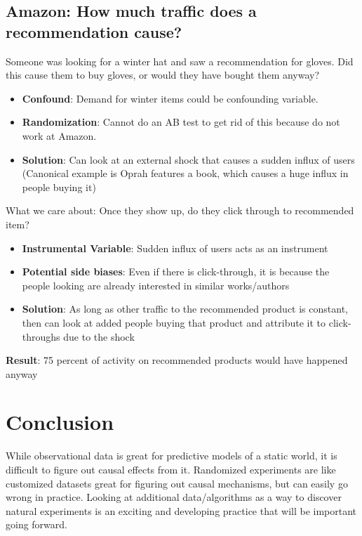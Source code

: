 \subsection{Amazon: How much traffic does a recommendation cause?}
Someone was looking for a winter hat and saw a recommendation for gloves. Did this cause them to buy gloves, or would they have bought them anyway? 
\begin{itemize}
\item \textbf{Confound}: Demand for winter items could be confounding variable.
\item \textbf{Randomization}: Cannot do an AB test to get rid of this because do not work at Amazon. 
\item \textbf{Solution}: Can look at an external shock that causes a sudden influx of users (Canonical example is Oprah features a book, which causes a huge influx in people buying it)
\end{itemize}
What we care about: Once they show up, do they click through to recommended item?
\begin{itemize}
\item \textbf{Instrumental Variable}: Sudden influx of users acts as an instrument
\item \textbf{Potential side biases}: Even if there is click-through, it is because the people looking are already interested in similar works/authors 
\item \textbf{Solution}: As long as other traffic to the recommended product is constant, then can look at added people buying that product and attribute it to click-throughs due to the shock
\end{itemize}
\textbf{Result}: 75 percent of activity on recommended products would have happened anyway

\section{Conclusion}
While observational data is great for predictive models of a static world, it is difficult to figure out causal effects from it. Randomized experiments are like customized datasets great for figuring out causal mechanisms, but can easily go wrong in practice. Looking at additional data/algorithms as a way to discover natural experiments is an exciting and developing practice that will be important going forward.
